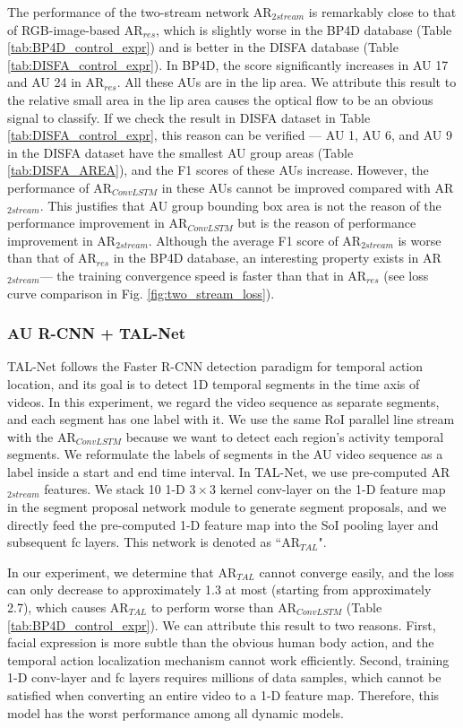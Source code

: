 \documentclass[5p,twocolumn]{elsarticle}
\begin{document}
The performance of the two-stream network AR$_{2stream}$ is remarkably close to that of RGB-image-based AR$_{res}$, which is slightly worse in the BP4D database (Table \ref{tab:BP4D_control_expr}) and is better in the DISFA database (Table \ref{tab:DISFA_control_expr}). In BP4D, the score significantly increases in AU 17 and AU 24 in AR$_{res}$. All these AUs are in the lip area. We attribute this result to the relative small area in the lip area causes the optical flow to be an obvious signal to classify. If we check the result in DISFA dataset in Table \ref{tab:DISFA_control_expr}, this reason can be verified --- AU 1, AU 6, and AU 9 in the DISFA dataset have the smallest AU group areas (Table \ref{tab:DISFA_AREA}), and the F1 scores of these AUs increase. However, the performance of AR$_{ConvLSTM}$ in these AUs cannot be improved compared with AR$_{2stream}$. This justifies that AU group bounding box area is not the reason of the performance improvement in AR$_{ConvLSTM}$ but is the reason of performance improvement in AR$_{2stream}$.
Although the average F1 score of AR$_{2stream}$ is worse than that of AR$_{res}$ in the BP4D database, an interesting property exists in AR$_{2stream}$--- the training convergence speed is faster than that in AR$_{res}$ (see loss curve comparison in Fig. \ref{fig:two_stream_loss}).  



\subsubsection{AU R-CNN + TAL-Net}


TAL-Net \cite{chao2018rethinking} follows the Faster R-CNN detection paradigm for temporal action location, and its goal is to detect 1D temporal segments in the time axis of videos. In this experiment, we regard the video sequence as separate segments, and each segment has one label with it.
We use the same RoI parallel line stream with the AR$_{ConvLSTM}$ because we want to detect each region's activity temporal segments. We reformulate the labels of segments in the AU video sequence as a label inside a start and end time interval. In TAL-Net, we use pre-computed AR$_{2stream}$ features. We stack 10 1-D $3\times 3$ kernel conv-layer on the 1-D feature map in the segment proposal network module to generate segment proposals, and we directly feed the pre-computed 1-D feature map into the SoI pooling layer and subsequent fc layers. This network is denoted as ``AR$_{TAL}$".

In our experiment, we determine that AR$_{TAL}$ cannot converge easily, and the loss can only decrease to approximately 1.3 at most (starting from approximately 2.7), which causes AR$_{TAL}$ to perform worse than AR$_{ConvLSTM}$ (Table \ref{tab:BP4D_control_expr}). We can attribute this result to two reasons. First, facial expression is more subtle than the obvious human body action, and the temporal action localization mechanism cannot work efficiently. Second, training 1-D conv-layer and fc layers requires millions of data samples, which cannot be satisfied when converting an entire video to a 1-D feature map. Therefore, this model has the worst performance among all dynamic models.
\end{document}
